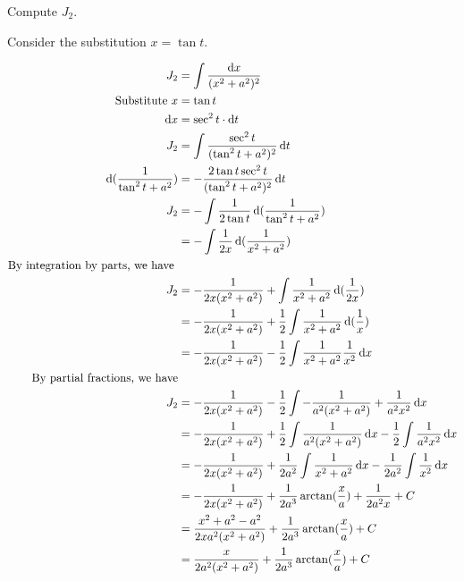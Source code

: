 \documentclass{alittlebear}
\begin{document}
\begin{exercise}{}{}
    \begin{question}{}{}
        Compute $J_{2}$.
        \begin{hint}
            Consider the substitution $x=\tan t$.
        \end{hint}
        \tcblower
        \begin{mathnote}
            \begin{align*}
                J_2 &=\int \frac{\D x}{(x^2+a^2)^2}\\
                \text{Substitute } x&=\tan t\\
                \D x&=\sec^2 t \cdot \D t\\
                J_2&=\int \frac{\sec^2 t}{(\tan^2 t + a^2)^2}\D t\\
                \D (\frac{1}{\tan^2 t + a^2}) &= -\frac{2\tan t\sec^2 t}{(\tan^2 t + a^2)^2}\D t\\
                J_2&=-\int \frac{1}{2\tan t}\D (\frac{1}{\tan^2 t + a^2})\\
                &=-\int \frac{1}{2x}\D (\frac{1}{x^2+a^2})\\
                \text{By integration by parts, we have }&\\
                J_2&=-\frac{1}{2x(x^2+a^2)}+\int \frac{1}{x^2+a^2}\D (\frac{1}{2x})\\
                &=-\frac{1}{2x(x^2+a^2)}+\frac{1}{2}\int \frac{1}{x^2+a^2}\D (\frac{1}{x})\\
                &=-\frac{1}{2x(x^2+a^2)}-\frac{1}{2}\int \frac{1}{x^2+a^2}\frac{1}{x^2}\D x\\
                \text{By partial fractions, we have}\\
                J_2&=-\frac{1}{2x(x^2+a^2)}-\frac{1}{2}\int -\frac{1}{a^2(x^2+a^2)}+\frac{1}{a^2x^2}\D x\\
                &=-\frac{1}{2x(x^2+a^2)}+\frac{1}{2}\int \frac{1}{a^2(x^2+a^2)}\D x -\frac{1}{2}\int\frac{1}{a^2x^2}\D x\\
                &=-\frac{1}{2x(x^2+a^2)}+\frac{1}{2a^2}\int \frac{1}{x^2+a^2}\D x -\frac{1}{2a^2}\int\frac{1}{x^2}\D x\\
                &=-\frac{1}{2x(x^2+a^2)}+\frac{1}{2a^3}\arctan(\frac{x}a) +\frac{1}{2a^2 x} + C\\
                &=\frac{x^2+a^2-a^2}{2xa^2(x^2+a^2)}+\frac{1}{2a^3}\arctan(\frac{x}a) + C\\
                &=\frac{x}{2a^2(x^2+a^2)}+\frac{1}{2a^3}\arctan(\frac{x}a) + C\\
            \end{align*}
        \end{mathnote}
    \end{question}


\end{exercise}
\end{document}

